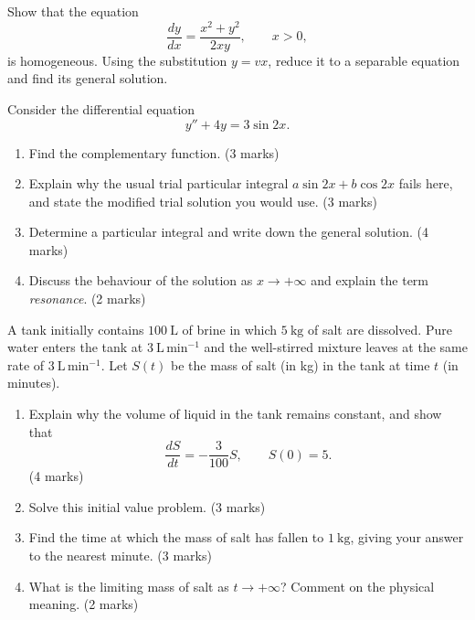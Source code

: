 \documentclass[11pt]{article}
\newcounter{popsec}
\newcounter{popsub}
\newcommand{\courssub}[1]{%
  \stepcounter{popsub}%
  \par\vspace{9pt}\noindent{\popxbold\fontsize{11.5}{13}\selectfont\color{popink}{\color{poporange}\thepopsec.\thepopsub}\hspace{6pt}#1}\par\nopagebreak\vspace{4pt}
}
\begin{document}
\begin{exercice}
Show that the equation
\[ \frac{dy}{dx} = \frac{x^2 + y^2}{2xy}, \qquad x > 0, \]
is homogeneous. Using the substitution $y = vx$, reduce it to a separable equation and find its general solution.
\end{exercice}

\courssub{I prepare for the GCE}

\begin{exercice}
Consider the differential equation
\[ y'' + 4y = 3\sin 2x. \]
\begin{enumerate}
\item Find the complementary function. \hfill (3 marks)
\item Explain why the usual trial particular integral $a\sin 2x + b\cos 2x$ fails here, and state the modified trial solution you would use. \hfill (3 marks)
\item Determine a particular integral and write down the general solution. \hfill (4 marks)
\item Discuss the behaviour of the solution as $x \to +\infty$ and explain the term \emph{resonance}. \hfill (2 marks)
\end{enumerate}
\end{exercice}

\begin{exercice}
A tank initially contains $100\ \mathrm{L}$ of brine in which $5\ \mathrm{kg}$ of salt are dissolved. Pure water enters the tank at $3\ \mathrm{L\,min^{-1}}$ and the well-stirred mixture leaves at the same rate of $3\ \mathrm{L\,min^{-1}}$. Let $S(t)$ be the mass of salt (in kg) in the tank at time $t$ (in minutes).
\begin{enumerate}
\item Explain why the volume of liquid in the tank remains constant, and show that
\[ \frac{dS}{dt} = -\frac{3}{100}S, \qquad S(0) = 5. \] \hfill (4 marks)
\item Solve this initial value problem. \hfill (3 marks)
\item Find the time at which the mass of salt has fallen to $1\ \mathrm{kg}$, giving your answer to the nearest minute. \hfill (3 marks)
\item What is the limiting mass of salt as $t \to +\infty$? Comment on the physical meaning. \hfill (2 marks)
\end{enumerate}
\end{exercice}
\end{document}
